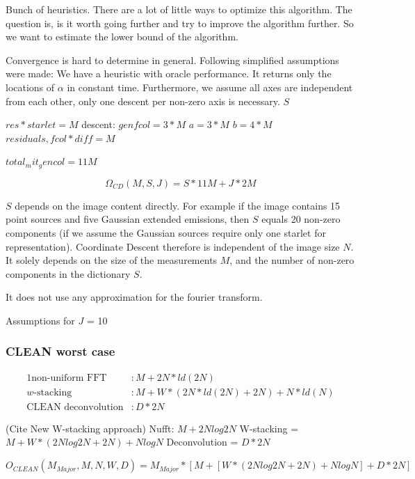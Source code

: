 Bunch of heuristics. There are a lot of little ways to optimize this algorithm. The question is, is it worth going further and try to improve the algorithm further. So we want to estimate the lower bound of the algorithm.

Convergence is hard to determine in general. Following simplified assumptions were made: We have a heuristic with oracle performance. It returns only the locations of $\alpha$ in constant time. Furthermore, we assume all axes are independent from each other, only one descent per non-zero axis is necessary.
$S$

$res * starlet = M$
descent:
$gen fcol = 3*M$
$a = 3 * M$
$b = 4 * M$
$residuals, fcol*diff =  M$

$total_mit_gencol = 11M$

\begin{equation}\label{results:cd:omega}
	\Omega_{CD}(M, S, J) = S * 11M + J * 2M
\end{equation}

$S$ depends on the image content directly. For example if the image contains 15 point sources and five Gaussian extended emissions, then $S$ equals 20 non-zero components (if we assume the Gaussian sources require only one starlet for representation). Coordinate Descent therefore is independent of the image size $N$. It solely depends on the size of the measurements $M$, and the number of non-zero components in the dictionary $S$. 

It does not use any approximation for the fourier transform.

Assumptions for $J$ = 10

\subsubsection{CLEAN worst case}

\begin{alignat*}{1}
	\text{non-uniform FFT} &: M + 2N*ld(2N)\\
	w \text{-stacking} &:M + W*(2N*ld(2N) + 2N) + N*ld(N)\\
	\text{CLEAN deconvolution} &: D*2N
\end{alignat*}

(Cite New W-stacking approach)
Nufft: $M + 2N log 2N$
W-stacking = $M + W*(2N log 2N + 2N) + N log N$
Deconvolution = $D*2N$


\begin{equation}
O_{CLEAN}(M_{Major}, M, N,  W, D) = M_{Major} * [M + [W*(2N log 2N + 2N) + N log N] + D*2N]
\end{equation}

